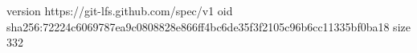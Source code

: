 version https://git-lfs.github.com/spec/v1
oid sha256:72224c6069787ea9c0808828e866ff4bc6de35f3f2105c96b6cc11335bf0ba18
size 332
